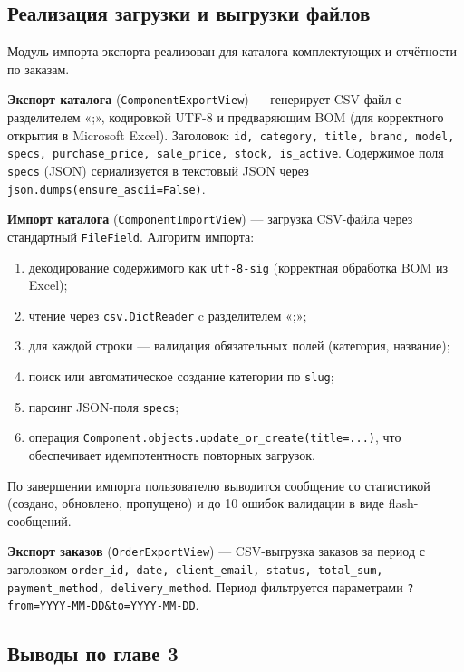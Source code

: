 \documentclass[14pt, a4paper]{extarticle}
\begin{document}
\subsection{Реализация загрузки и выгрузки файлов}

Модуль импорта-экспорта реализован для каталога комплектующих и отчётности по заказам.

\textbf{Экспорт каталога} (\texttt{ComponentExportView}) --- генерирует CSV-файл с разделителем «;», кодировкой UTF-8 и предваряющим BOM (для корректного открытия в Microsoft Excel). Заголовок: \texttt{id, category, title, brand, model, specs, purchase\_price, sale\_price, stock, is\_active}. Содержимое поля \texttt{specs} (JSON) сериализуется в текстовый JSON через \texttt{json.dumps(ensure\_ascii=False)}.

\textbf{Импорт каталога} (\texttt{ComponentImportView}) --- загрузка CSV-файла через стандартный \texttt{FileField}. Алгоритм импорта:
\begin{enumerate}
    \item декодирование содержимого как \texttt{utf-8-sig} (корректная обработка BOM из Excel);
    \item чтение через \texttt{csv.DictReader} c разделителем «;»;
    \item для каждой строки --- валидация обязательных полей (категория, название);
    \item поиск или автоматическое создание категории по \texttt{slug};
    \item парсинг JSON-поля \texttt{specs};
    \item операция \texttt{Component.objects.update\_or\_create(title=...)}, что обеспечивает идемпотентность повторных загрузок.
\end{enumerate}

По завершении импорта пользователю выводится сообщение со статистикой (создано, обновлено, пропущено) и до 10 ошибок валидации в виде flash-сообщений.

\textbf{Экспорт заказов} (\texttt{OrderExportView}) --- CSV-выгрузка заказов за период с заголовком \texttt{order\_id, date, client\_email, status, total\_sum, payment\_method, delivery\_method}. Период фильтруется параметрами \texttt{?from=YYYY-MM-DD\&to=YYYY-MM-DD}.

\subsection*{Выводы по главе 3}
\end{document}

